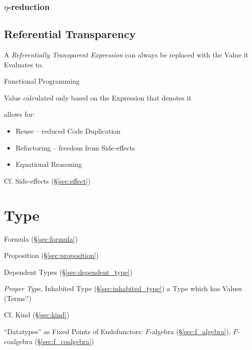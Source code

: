 \subsubsection{$\eta$-reduction}\label{sec:eta_reduction}



\subsection{Referential Transparency}\label{sec:referential_transparency}

A \emph{Referentially Transparent Expression} can always be replaced
with the Value it Evaluates to.

Functional Programming

Value calculated only based on the Expression that
denotes it

allows for:
\begin{itemize}
\item Reuse -- reduced Code Duplication
\item Refactoring -- freedom from Side-effects
\item Equational Reasoning
\end{itemize}

\fist Cf. Side-effects (\S\ref{sec:effect})



\section{Type}\label{sec:type}

Formula (\S\ref{sec:formula})

Proposition (\S\ref{sec:proposition})


Dependent Types (\S\ref{sec:dependent_type})

\emph{Proper Type}, Inhabited Type (\S\ref{sec:inhabited_type}) a Type
which has Values (Terms?)

\fist Cf. Kind (\S\ref{sec:kind})


``Datatypes'' as Fixed Points of Endofunctors: $F$-algebra
(\S\ref{sec:f_algebra}), $F$-coalgebra (\S\ref{sec:f_coalgebra})



